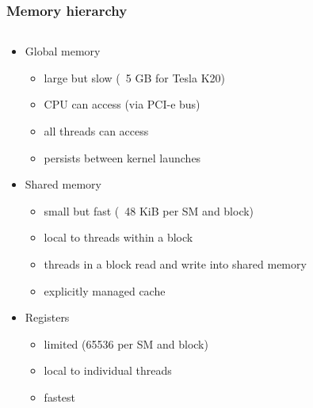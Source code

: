 \documentclass[10pt]{beamer}
\begin{document}
\begin{frame}
\frametitle{Memory hierarchy}
\begin{columns}
\begin{column}{0.5\textwidth}
\begin{itemize}
\item Global memory{
\begin{itemize}
    \item large but slow (~5 GB for Tesla K20)
    \item CPU can access (via PCI-e bus)
    \item all threads can access
    \item persists between kernel launches
\end{itemize}}
\item Shared memory{
\begin{itemize}
    \item small but fast (~48 KiB per SM and block)
    \item local to threads within a block
    \item threads in a block read and write into shared memory
    \item explicitly managed cache
\end{itemize}}
\item Registers{
\begin{itemize}
    \item limited (65536 per SM and block)
    \item local to individual threads
    \item fastest
\end{itemize}}
\end{itemize}
\end{column}
\begin{column}{0.5\textwidth}
\end{column}
\end{columns}
\end{frame}
\end{document}
